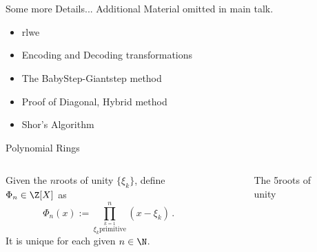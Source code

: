 \appendix
\section{\appendixname}
\begin{frame}{Some more Details...}
  Additional Material omitted in main talk.

  \begin{itemize}
    \item \glsdesc{rlwe}
    \item Encoding and Decoding transformations
    \item The BabyStep-Giantstep method
    \item Proof of Diagonal, Hybrid method
    \item Shor's Algorithm
  \end{itemize}
\end{frame}

\begin{frame}{Polynomial Rings}
  \begin{columns}
    \begin{column}{0.6\linewidth}
      \begin{definition}
        Given the $n$\th roots of unity $\{\xi_k\}$, define $\Phi_n \in \Z[X]$ as
        $$\Phi_n(x) := \prod_{\stackrel{k=1}{\xi_k \mathrm{primitive}}}^{n} (x - \xi_k) \,.$$
        It is unique for each given $n \in \N$.
      \end{definition}
    \end{column}
    \begin{column}{0.32\linewidth}
      \begin{figure}
        \caption{The 5\th roots of unity}
        \label{fig:nth-roots-of-unity}
      \end{figure}
    \end{column}
  \end{columns}
\end{frame}


